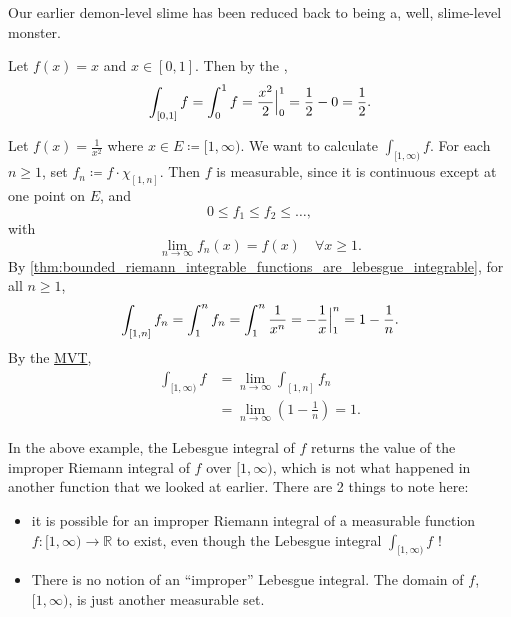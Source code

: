\documentclass[notoc,notitlepage]{tufte-book}
\begin{document}
Our earlier demon-level slime has been reduced back to being a, well,
slime-level monster.

\begin{eg}
  Let $f(x) = x$ and $x \in [0, 1]$. Then by the ,
  \begin{equation*}
    \int_{[0, 1]} f = \int_{0}^{1} f = \frac{x^2}{2} \Big|_{0}^{1} = \frac{1}{2} - 0
    = \frac{1}{2}.
  \end{equation*}
\end{eg}

\begin{eg}
  Let $f(x) = \frac{1}{x^2}$ where $x \in E \coloneqq [1, \infty)$. We want to
  calculate $\int_{[1, \infty)} f$. For each $n \geq 1$, set $f_n \coloneqq f
  \cdot \chi_{[1, n]}$. Then $f$ is measurable, since it is
  continuous except at one point on $E$, and
  \begin{equation*}
    0 \leq f_1 \leq f_2 \leq \hdots,
  \end{equation*}
  with
  \begin{equation*}
    \lim_{n \to \infty} f_n(x) = f(x) \quad \forall x \geq 1.
  \end{equation*}
  By \cref{thm:bounded_riemann_integrable_functions_are_lebesgue_integrable},
  for all $n \geq 1$,
  \begin{equation*}
    \int_{[1, n]} f_n = \int_{1}^{n} f_n = \int_{1}^{n} \frac{1}{x^n} =
    -\frac{1}{x} \Big|_{1}^{n} = 1 - \frac{1}{n}.
  \end{equation*}
  By the \hyperref[thm:the_monotone_convergence_theorem]{MVT},
  \begin{align*}
    \int_{[1, \infty)} f
    &= \lim_{n \to \infty} \int_{[1, n]} f_n \\
    &= \lim_{n \to \infty} \left( 1 - \frac{1}{n} \right) = 1.
  \end{align*}
\end{eg}

\begin{note}
  In the above example, the Lebesgue integral of $f$ returns the value of the
  improper Riemann integral of $f$ over $[1, \infty)$, which is not what
  happened in another function that we looked at earlier. There are 2 things to
  note here:
  \begin{itemize}
    \item it is possible for an improper Riemann integral of a measurable
      function $f : [1, \infty) \to \mathbb{R}$ to exist, even though the
      Lebesgue integral $\int_{[1, \infty)} f$ !
    \item There is no notion of an ``improper'' Lebesgue integral. The domain of
      $f$, $[1, \infty)$, is just another measurable set.
  \end{itemize}
\end{note}
\end{document}
